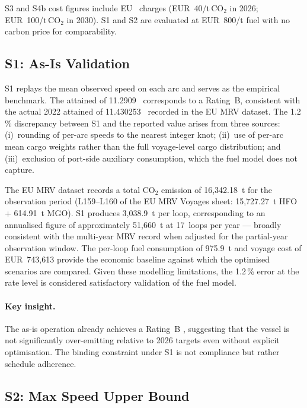 S3 and S4b cost figures include EU~\ETS{} charges (EUR~40/t\,CO$_2$ in 2026;
EUR~100/t\,CO$_2$ in 2030).  S1 and S2 are evaluated at EUR~800/t fuel with no
carbon price for comparability.

\subsection{S1: As-Is Validation}
\label{sec:res:s1}

S1 replays the mean observed speed on each arc and serves as the empirical
benchmark.  The attained \CII{} of 11.2909~\gGTnm{} corresponds to a
Rating~B, consistent with the actual 2022 attained \CII{} of
11.430253~\gGTnm{} recorded in the EU MRV dataset.  The 1.2\,\% discrepancy
between S1 and the reported value arises from three sources: (i)~rounding of
per-arc speeds to the nearest integer knot; (ii)~use of per-arc mean cargo
weights rather than the full voyage-level cargo distribution; and
(iii)~exclusion of port-side auxiliary consumption, which the fuel model does
not capture.

The EU MRV dataset records a total CO$_2$ emission of
16{,}342.18~t for the observation period (L159--L160 of the EU MRV Voyages
sheet: 15{,}727.27~t HFO + 614.91~t MGO).  S1 produces
3{,}038.9~t per loop, corresponding to an annualised figure of
approximately 51{,}660~t at 17~loops per year --- broadly consistent with
the multi-year MRV record when adjusted for the partial-year observation
window.  The per-loop fuel consumption of 975.9~t and voyage cost of
EUR~743{,}613 provide the economic baseline against which the optimised
scenarios are compared.
Given these modelling limitations, the 1.2\,\% error at the
\CII{} rate level is considered satisfactory validation of the fuel model.

\paragraph{Key insight.}
The as-is operation already achieves a Rating~B \CII{}, suggesting that
the vessel is not significantly over-emitting relative to 2026 targets
even without explicit optimisation.  The binding constraint under S1 is
not \CII{} compliance but rather schedule adherence.

\subsection{S2: Max Speed Upper Bound}
\label{sec:res:s2}

